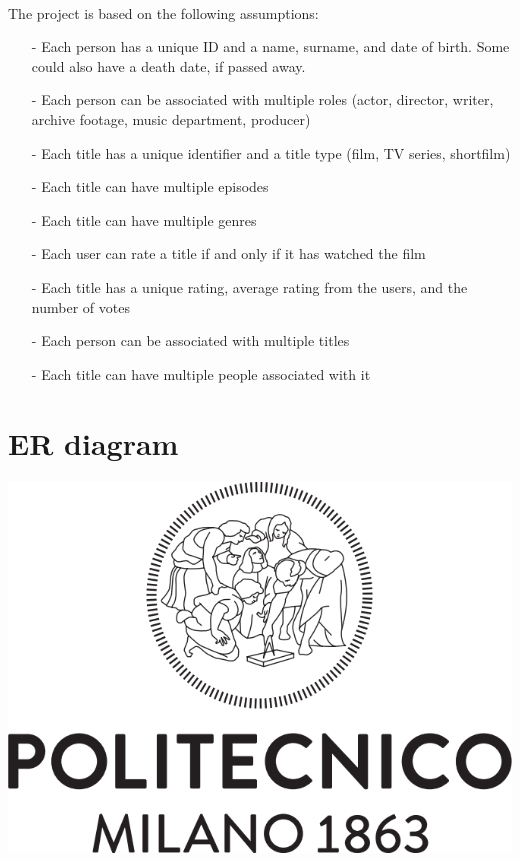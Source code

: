 \documentclass[a4paper,12pt]{article}
\begin{document}
\paragraph{} The project is based on the following assumptions:
\begin{itemize}[noitemsep]
   \item[-] Each person has a unique ID and a name, surname, and date of birth. Some could also have a death date, if passed away.
   \item[-] Each person can be associated with multiple roles (actor, director, writer, archive footage, music department, producer)
   \item[-] Each title has a unique identifier and a title type (film, TV series, shortfilm)
   \item[-] Each title can have multiple episodes
   \item[-] Each title can have multiple genres
   \item[-] Each user can rate a title if and only if it has watched the film
   \item[-] Each title has a unique rating, average rating from the users, and the number of votes
   \item[-] Each person can be associated with multiple titles
   \item[-] Each title can have multiple people associated with it
\end{itemize}
\clearpage
\section{ER diagram}
\paragraph{}
	\begin{center}
 		\includegraphics[width = 15 cm]{polilogo.png}
	\end{center}
\end{document}
